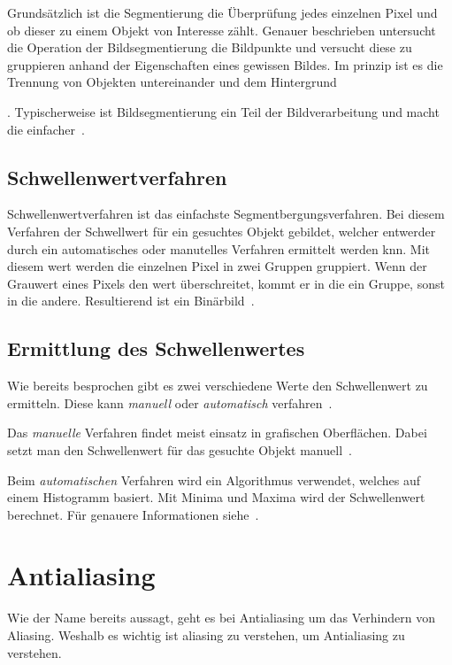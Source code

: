 Grundsätzlich ist die Segmentierung die Überprüfung jedes einzelnen Pixel und ob dieser zu einem Objekt von Interesse zählt.
Genauer beschrieben untersucht die Operation der Bildsegmentierung die Bildpunkte und versucht diese zu gruppieren anhand der Eigenschaften eines gewissen Bildes.
Im prinzip ist es die Trennung von Objekten untereinander und dem Hintergrund~{\cite{Kuerbig_2005}.
Typischerweise ist Bildsegmentierung ein Teil der Bildverarbeitung und macht die einfacher~\cite{Erhardt_2017}.

\subsection{Schwellenwertverfahren}
\label{subsec:schwellenwertverfahren}

Schwellenwertverfahren ist das einfachste Segmentbergungsverfahren.
Bei diesem Verfahren der Schwellwert für ein gesuchtes Objekt gebildet, welcher entwerder durch ein automatisches oder manutelles Verfahren ermittelt werden knn.
Mit diesem wert werden die einzelnen Pixel in zwei Gruppen gruppiert.
Wenn der Grauwert eines Pixels den wert überschreitet, kommt er in die ein Gruppe, sonst in die andere.
Resultierend ist ein Binärbild~\cite{Erhardt_2017}.

\subsection{Ermittlung des Schwellenwertes}
\label{subsec:ermittlung-des-schwellenwertes}

Wie bereits besprochen gibt es zwei verschiedene Werte den Schwellenwert zu ermitteln.
Diese kann \emph{manuell} oder \emph{automatisch} verfahren~\cite{Erhardt_2017}.

Das \emph{manuelle} Verfahren findet meist einsatz in grafischen Oberflächen.
Dabei setzt man den Schwellenwert für das gesuchte Objekt manuell~\cite{Erhardt_2017}.

Beim \emph{automatischen} Verfahren wird ein Algorithmus verwendet, welches auf einem Histogramm basiert.
Mit Minima und Maxima wird der Schwellenwert berechnet.
Für genauere Informationen siehe~\cite{Erhardt_2017}.

\section{Antialiasing}
\label{sec:antialiasing}

Wie der Name bereits aussagt, geht es bei Antialiasing um das Verhindern von Aliasing.
Weshalb es wichtig ist aliasing zu verstehen, um Antialiasing zu verstehen.

}
